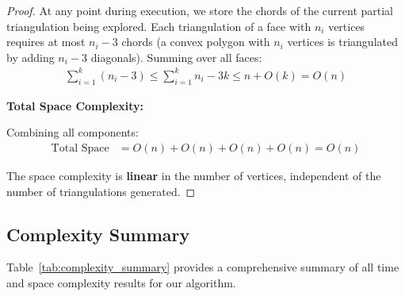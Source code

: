 \documentclass[12pt,a4paper]{article}
\theoremstyle{definition}
\theoremstyle{remark}
\begin{document}
\begin{proof}
At any point during execution, we store the chords of the current partial triangulation being explored. Each triangulation of a face with $n_i$ vertices requires at most $n_i - 3$ chords (a convex polygon with $n_i$ vertices is triangulated by adding $n_i - 3$ diagonals). Summing over all faces:
\begin{align*}
\sum_{i=1}^{k} (n_i - 3) \leq \sum_{i=1}^{k} n_i - 3k \leq n + O(k) = O(n)
\end{align*}

\textbf{Total Space Complexity:}

Combining all components:
\begin{align*}
\text{Total Space} &= O(n) + O(n) + O(n) + O(n) = O(n)
\end{align*}

The space complexity is \textbf{linear} in the number of vertices, independent of the number of triangulations generated.
\end{proof}

\subsection{Complexity Summary}

Table~\ref{tab:complexity_summary} provides a comprehensive summary of all time and space complexity results for our algorithm.
\end{document}
